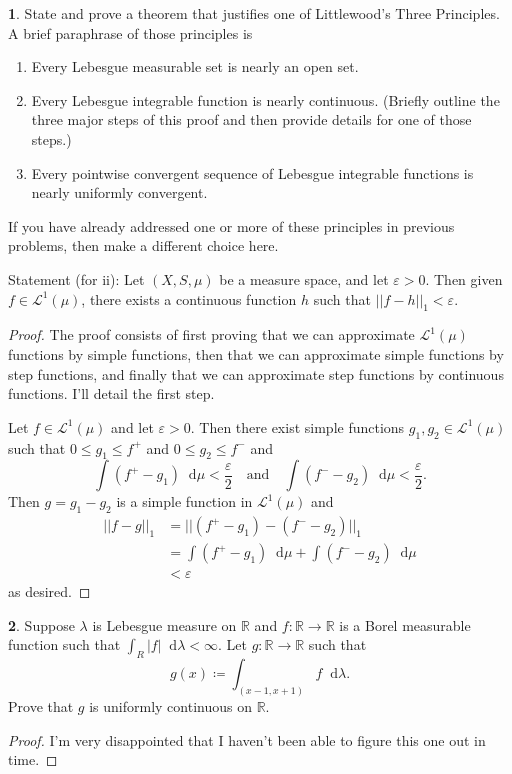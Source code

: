 \documentclass[12pt]{article}
\newcommand{\dd}{\mathop{}\!\mathrm{d}}
\theoremstyle{definition}
\newtheorem{ex}{}
\newenvironment{exercise}[1]{
	\renewcommand{\theex}{#1}
	\begin{ex}
		}{\end{ex}}
\begin{document}
\begin{exercise}{3(b)}
	State and prove a theorem that justifies one of Littlewood's Three Principles.
	A brief paraphrase of those principles is \begin{enumerate}[label=\roman*.]
		\item Every Lebesgue measurable set is nearly an open set.
		\item Every Lebesgue integrable function is nearly continuous.
		      (Briefly outline the three major steps of this proof and then provide details for one of those steps.)
		\item Every pointwise convergent sequence of Lebesgue integrable functions is nearly uniformly convergent.
	\end{enumerate}
	If you have already addressed one or more of these principles in previous problems, then make a different choice here.
\end{exercise}
Statement (for ii): Let $(X, S, \mu)$ be a measure space, and let $\varepsilon > 0$.
Then given $f \in \mathcal{L}^1(\mu)$, there exists a continuous function $h$ such that $||f-h||_1 < \varepsilon$.
\begin{proof}
	The proof consists of first proving that we can approximate $\mathcal{L}^1(\mu)$ functions by simple functions, then that we can approximate simple functions by step functions, and finally that we can approximate step functions by continuous functions.
	I'll detail the first step.

	Let $f \in \mathcal{L}^1(\mu)$ and let $\varepsilon > 0$.
	Then there exist simple functions $g_1, g_2 \in \mathcal{L}^1(\mu)$ such that $0 \leq g_1 \leq f^+$ and $0 \leq g_2 \leq f^-$ and \begin{equation*}
		\int(f^+ - g_1)\dd\mu < \frac{\varepsilon}{2} \hspace{1em}\text{and}\hspace{1em} \int(f^- - g_2) \dd\mu < \frac{\varepsilon}{2}.
	\end{equation*}
	Then $g = g_1 - g_2$ is a simple function in $\mathcal{L}^1(\mu)$ and \begin{align*}
		||f - g||_1 & = ||(f^+ - g_1) - (f^- - g_2)||_1                 \\
		            & = \int (f^+ - g_1)\dd\mu + \int (f^- - g_2)\dd\mu \\
		            & < \varepsilon
	\end{align*}
	as desired.
\end{proof}

\begin{exercise}{3(c)}
	Suppose $\lambda$ is Lebesgue measure on $\mathbb{R}$ and $f: \mathbb{R} \to \mathbb{R}$ is a Borel measurable function such that $\int_R |f| \dd \lambda < \infty$.
	Let $g : \mathbb{R} \to \mathbb{R}$ such that \begin{equation*}
		g(x) \coloneq \int_{(x-1, x+1)} f \dd\lambda.
	\end{equation*}
	Prove that $g$ is uniformly continuous on $\mathbb{R}$.
\end{exercise}
\begin{proof}
	I'm very disappointed that I haven't been able to figure this one out in time.
\end{proof}
\end{document}
